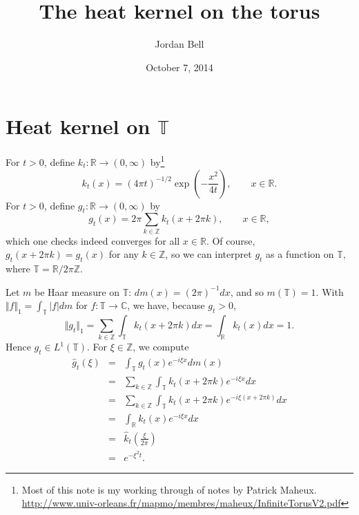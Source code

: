 \documentclass{article}
\newcommand{\norm}[1]{\Vert #1 \Vert}
\begin{document}
\title{The heat kernel on the torus}
\author{Jordan Bell}
\date{October 7, 2014}
\maketitle

\section{Heat kernel on $\mathbb{T}$}
For $t>0$, define $k_t:\mathbb{R} \to (0,\infty)$ by\footnote{Most of this note is my working through of notes by Patrick Maheux. \url{http://www.univ-orleans.fr/mapmo/membres/maheux/InfiniteTorusV2.pdf}}
\[
k_t(x) = (4\pi t)^{-1/2} \exp \left( - \frac{x^2}{4t} \right), \qquad x \in \mathbb{R}.
\]
For $t>0$, define $g_t:\mathbb{R} \to (0,\infty)$ by
\[
g_t(x) = 2\pi \sum_{k \in \mathbb{Z}} k_t(x+2\pi k), \qquad x \in \mathbb{R},
\]
which one checks indeed converges for all $x \in \mathbb{R}$. Of course, $g_t(x+2\pi k)=g_t(x)$ for any $k \in \mathbb{Z}$, 
so we can interpret $g_t$ as a function on $\mathbb{T}$, where $\mathbb{T} = \mathbb{R}/2\pi\mathbb{Z}$. 

Let $m$ be Haar measure on $\mathbb{T}$: $dm(x)=(2\pi)^{-1} dx$, and so $m(\mathbb{T})=1$.
With $\norm{f}_1 = \int_{\mathbb{T}} |f| dm$ for $f:\mathbb{T} \to \mathbb{C}$, we have, because $g_t>0$,
\[
\norm{g_t}_1=\sum_{k \in \mathbb{Z}} \int_{\mathbb{T}} k_t(x+2\pi k) dx=\int_{\mathbb{R}} k_t(x) dx = 1.
\]
Hence $g_t \in L^1(\mathbb{T})$. For $\xi \in \mathbb{Z}$, we compute
\begin{eqnarray*}
\hat{g}_t(\xi)&=&\int_{\mathbb{T}} g_t(x) e^{-i\xi x} dm(x)\\
&=&\sum_{k \in \mathbb{Z}} \int_{\mathbb{T}} k_t(x+2\pi k) e^{-i\xi  x} dx\\
&=&\sum_{k \in \mathbb{Z}} \int_{\mathbb{T}} k_t(x+2\pi k) e^{-i\xi  (x+2\pi k)} dx\\
&=&\int_{\mathbb{R}} k_t(x) e^{-i\xi x} dx\\
&=&\hat{k}_t\left(\frac{\xi}{2\pi} \right)\\
&=&e^{-\xi^2 t}.
\end{eqnarray*}
\end{document}
